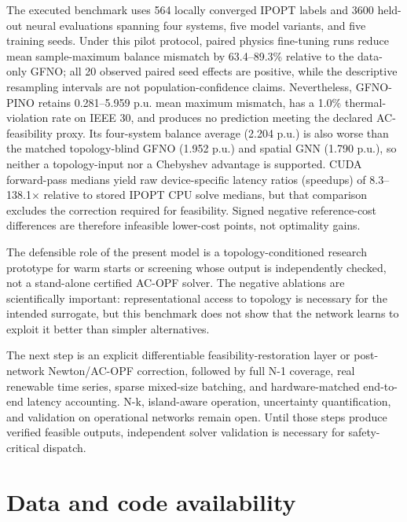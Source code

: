 \documentclass[final,5p,times,twocolumn]{elsarticle}
\begin{document}
The executed benchmark uses 564 locally converged IPOPT labels and 3600
held-out neural evaluations spanning four systems, five model variants, and
five training seeds. Under this pilot protocol, paired physics fine-tuning
runs reduce mean sample-maximum balance mismatch by 63.4--89.3\% relative to
the data-only GFNO; all 20 observed paired seed effects are positive, while
the descriptive resampling intervals are not population-confidence claims.
Nevertheless, GFNO-PINO retains 0.281--5.959 p.u. mean maximum mismatch, has a
1.0\% thermal-violation rate on IEEE 30, and produces no prediction
meeting the declared AC-feasibility proxy. Its four-system balance average
(2.204 p.u.) is also worse than the matched topology-blind GFNO (1.952 p.u.)
and spatial GNN (1.790 p.u.), so neither a topology-input nor a Chebyshev
advantage is supported. CUDA forward-pass medians yield raw device-specific
latency ratios (speedups) of 8.3--138.1$\times$ relative to stored IPOPT CPU
solve medians, but that comparison excludes the correction
required for feasibility. Signed negative reference-cost differences are
therefore infeasible lower-cost points, not optimality gains.

The defensible role of the present model is a topology-conditioned research
prototype for warm starts or screening whose output is independently checked,
not a stand-alone certified AC-OPF solver. The negative ablations are
scientifically important: representational access to topology is necessary for
the intended surrogate, but this benchmark does not show that the network learns
to exploit it better than simpler alternatives.

The next step is an explicit differentiable feasibility-restoration layer or
post-network Newton/AC-OPF correction, followed by full N-1 coverage, real
renewable time series, sparse mixed-size batching, and hardware-matched
end-to-end latency accounting. N-k, island-aware operation, uncertainty
quantification, and validation on operational networks remain open. Until
those steps produce verified feasible outputs, independent solver validation
is necessary for safety-critical dispatch.

\section*{Data and code availability}
\end{document}
